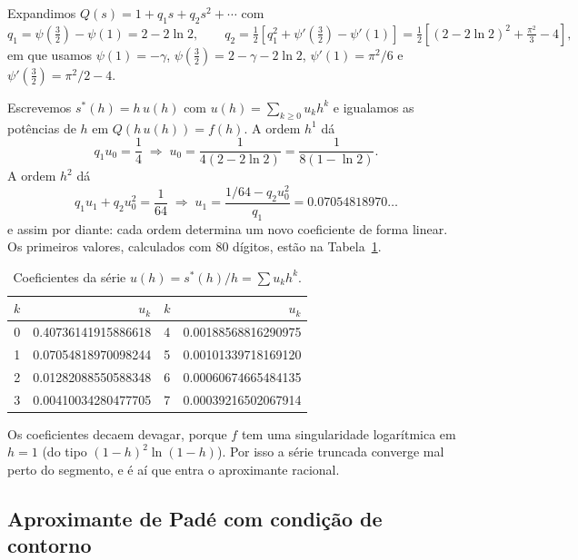 \documentclass[11pt,a4paper]{article}
\theoremstyle{definition}
\theoremstyle{remark}
\begin{document}
Expandimos $Q(s)=1+q_1s+q_2s^2+\cdots$ com
\begin{equation}
  q_1=\psi\!\left(\tfrac32\right)-\psi(1)=2-2\ln2,\qquad
  q_2=\tfrac12\left[q_1^2+\psi'\!\left(\tfrac32\right)-\psi'(1)\right]
     =\tfrac12\left[(2-2\ln 2)^2+\tfrac{\pi^2}{3}-4\right],
\end{equation}
em que usamos $\psi(1)=-\gamma$, $\psi(\tfrac32)=2-\gamma-2\ln2$,
$\psi'(1)=\pi^2/6$ e $\psi'(\tfrac32)=\pi^2/2-4$.

Escrevemos $s^*(h)=h\,u(h)$ com $u(h)=\sum_{k\ge0}u_kh^k$ e igualamos as
potências de $h$ em $Q(h\,u(h))=f(h)$. A ordem $h^1$ dá
\begin{equation}
  q_1u_0=\frac14\;\Longrightarrow\;
  u_0=\frac{1}{4(2-2\ln 2)}=\frac{1}{8(1-\ln2)}.
\end{equation}
A ordem $h^2$ dá
\begin{equation}
  q_1u_1+q_2u_0^2=\frac1{64}\;\Longrightarrow\;
  u_1=\frac{1/64-q_2u_0^2}{q_1}=0.07054818970\ldots
\end{equation}
e assim por diante: cada ordem determina um novo coeficiente de forma linear. Os
primeiros valores, calculados com 80 dígitos, estão na Tabela~\ref{tab:u}.

\begin{table}[h]
\centering
\begin{tabular}{cr@{\qquad}cr}
\toprule
$k$ & $u_k$ & $k$ & $u_k$\\
\midrule
0 & 0.40736141915886618 & 4 & 0.00188568816290975\\
1 & 0.07054818970098244 & 5 & 0.00101339718169120\\
2 & 0.01282088550588348 & 6 & 0.00060674665484135\\
3 & 0.00410034280477705 & 7 & 0.00039216502067914\\
\bottomrule
\end{tabular}
\caption{Coeficientes da série $u(h)=s^*(h)/h=\sum u_kh^k$.}
\label{tab:u}
\end{table}

Os coeficientes decaem devagar, porque $f$ tem uma singularidade logarítmica em
$h=1$ (do tipo $(1-h)^2\ln(1-h)$). Por isso a série truncada converge mal perto
do segmento, e é aí que entra o aproximante racional.

\subsection{Aproximante de Padé com condição de contorno}\label{sec:pade}
\end{document}
